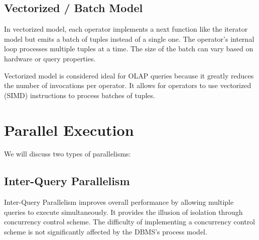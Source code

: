 \documentclass[11pt]{article}
\begin{document}
\subsection*{Vectorized / Batch Model}
In vectorized model, each operator implements a next function like the iterator model but emits a batch of tuples instead of a single one. The operator's internal loop processes multiple tuples at a time. The size of the batch can vary based on hardware or query properties.

Vectorized model is considered ideal for OLAP queries because it greatly reduces
the number of invocations per operator. It allows for operators to use vectorized (SIMD) instructions to process batches of tuples.


\section{Parallel Execution}
We will discuss two types of parallelisms:
\subsection*{Inter-Query Parallelism}
Inter-Query Parallelism improves overall performance by allowing multiple queries to execute simultaneously. It provides the illusion of isolation through concurrency control scheme. The difficulty of implementing a concurrency control scheme is not significantly affected by the DBMS’s process model.

\end{document}
